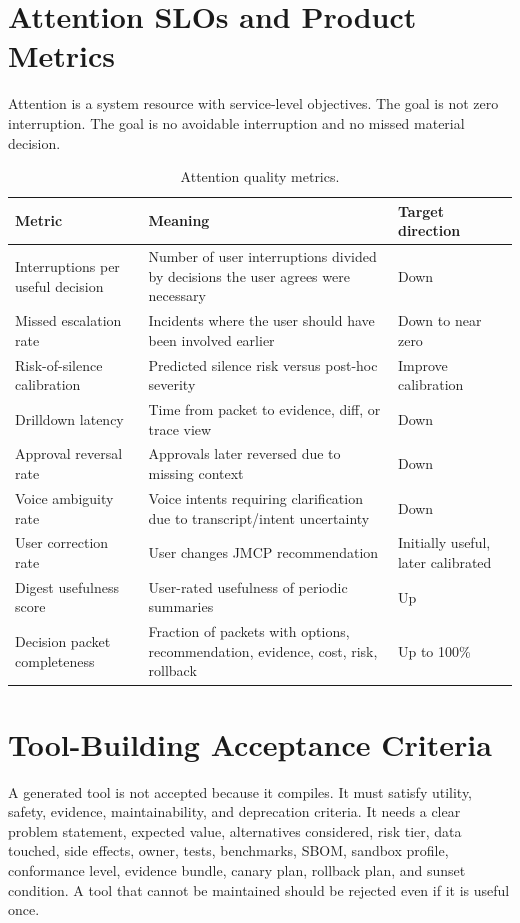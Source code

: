 \documentclass[journal,onecolumn]{IEEEtran}
\begin{document}
\section{Attention SLOs and Product Metrics}
Attention is a system resource with service-level objectives. The goal is not zero interruption. The goal is no avoidable interruption and no missed material decision.

\begin{longtable}{p{}p{}p{}}
\caption{Attention quality metrics.}\\
\toprule
Metric & Meaning & Target direction\\
\midrule
Interruptions per useful decision & Number of user interruptions divided by decisions the user agrees were necessary & Down\\
Missed escalation rate & Incidents where the user should have been involved earlier & Down to near zero\\
Risk-of-silence calibration & Predicted silence risk versus post-hoc severity & Improve calibration\\
Drilldown latency & Time from packet to evidence, diff, or trace view & Down\\
Approval reversal rate & Approvals later reversed due to missing context & Down\\
Voice ambiguity rate & Voice intents requiring clarification due to transcript/intent uncertainty & Down\\
User correction rate & User changes JMCP recommendation & Initially useful, later calibrated\\
Digest usefulness score & User-rated usefulness of periodic summaries & Up\\
Decision packet completeness & Fraction of packets with options, recommendation, evidence, cost, risk, rollback & Up to 100\%\\
\bottomrule
\end{longtable}

\section{Tool-Building Acceptance Criteria}
A generated tool is not accepted because it compiles. It must satisfy utility, safety, evidence, maintainability, and deprecation criteria. It needs a clear problem statement, expected value, alternatives considered, risk tier, data touched, side effects, owner, tests, benchmarks, SBOM, sandbox profile, conformance level, evidence bundle, canary plan, rollback plan, and sunset condition. A tool that cannot be maintained should be rejected even if it is useful once.
\end{document}
